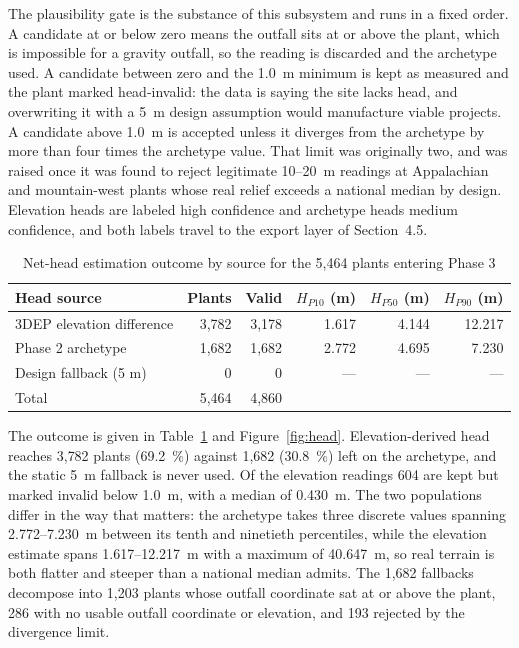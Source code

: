 \documentclass[12pt,letterpaper]{report}
\begin{document}
The plausibility gate is the substance of this subsystem and runs in a fixed
order. A candidate at or below zero means the outfall sits at or above the plant,
which is impossible for a gravity outfall, so the reading is discarded and the
archetype used. A candidate between zero and the 1.0~m minimum is kept as
measured and the plant marked head-invalid: the data is saying the site lacks
head, and overwriting it with a 5~m design assumption would manufacture viable
projects. A candidate above 1.0~m is accepted unless it diverges from the
archetype by more than four times the archetype value. That limit was originally
two, and was raised once it was found to reject legitimate 10--20~m readings at
Appalachian and mountain-west plants whose real relief exceeds a national median
by design. Elevation heads are labeled high confidence and archetype heads
medium confidence, and both labels travel to the export layer of Section~4.5.

\begin{table}[htbp]
\centering
\caption{Net-head estimation outcome by source for the 5,464 plants entering Phase 3}
\label{tab:head_outcome}
\small
\begin{tabular}{@{}lrrrrr@{}}
\toprule
Head source & Plants & Valid & $H_{P10}$ (m) & $H_{P50}$ (m) & $H_{P90}$ (m) \\
\midrule
3DEP elevation difference & 3{,}782 & 3{,}178 & 1.617 & 4.144 & 12.217 \\
Phase 2 archetype         & 1{,}682 & 1{,}682 & 2.772 & 4.695 & 7.230 \\
Design fallback (5 m)     & 0       & 0       & ---   & ---   & ---   \\
\midrule
Total                     & 5{,}464 & 4{,}860 &       &       &       \\
\bottomrule
\end{tabular}
\end{table}

The outcome is given in Table~\ref{tab:head_outcome} and Figure~\ref{fig:head}.
Elevation-derived head reaches 3{,}782 plants (69.2~\%) against 1{,}682
(30.8~\%) left on the archetype, and the static 5~m fallback is never used. Of
the elevation readings 604 are kept but marked invalid below 1.0~m, with a median
of 0.430~m. The two populations differ in the way that matters: the archetype
takes three discrete values spanning 2.772--7.230~m between its tenth and
ninetieth percentiles, while the elevation estimate spans 1.617--12.217~m with a
maximum of 40.647~m, so real terrain is both flatter and steeper than a national
median admits. The 1{,}682 fallbacks decompose into 1{,}203 plants whose outfall
coordinate sat at or above the plant, 286 with no usable outfall coordinate or
elevation, and 193 rejected by the divergence limit.
\end{document}
